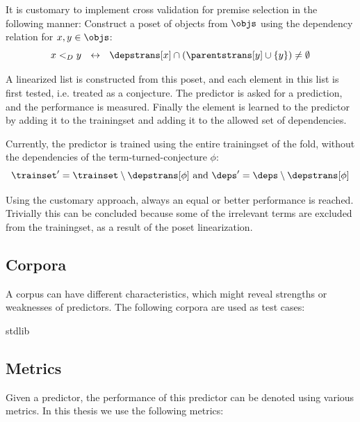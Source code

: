 It is customary to implement cross validation for premise selection in the following manner:
Construct a poset of objects from $\objs$ using the dependency relation for $x, y \in \objs$:
\[
	x <_D y ~~\leftrightarrow~~ \depstrans[x] \cap (\parentstrans[y] \cup \{y\}) \neq \emptyset
\]

A linearized list is constructed from this poset, and each element in this list is first tested, i.e. treated as a conjecture.
The predictor is asked for a prediction, and the performance is measured.
Finally the element is learned to the predictor by adding it to the trainingset and adding it to the allowed set of dependencies.

Currently, the predictor is trained using the entire trainingset of the fold, without the dependencies of the term-turned-conjecture $\phi$:
\[
	\trainset' = \trainset \setminus \depstrans[\phi] ~\text{and}~ \deps' = \deps \setminus \depstrans[\phi]
\]

Using the customary approach, always an equal or better performance is reached.
Trivially this can be concluded because some of the irrelevant terms are excluded from the trainingset, as a result of the poset linearization.

\subsection{Corpora}
\label{section:corpora}


A corpus can have different characteristics, which might reveal strengths or weaknesses of predictors.
The following corpora are used as test cases:

\begin{description}
	\item[\coq stdlib]
	\item[\compcert]
    \item[\formalin]
    \item[\corn]
    \item[\mathcomp]
\end{description}

\subsection{Metrics}
Given a predictor, the performance of this predictor can be denoted using various metrics.
In this thesis we use the following metrics:

